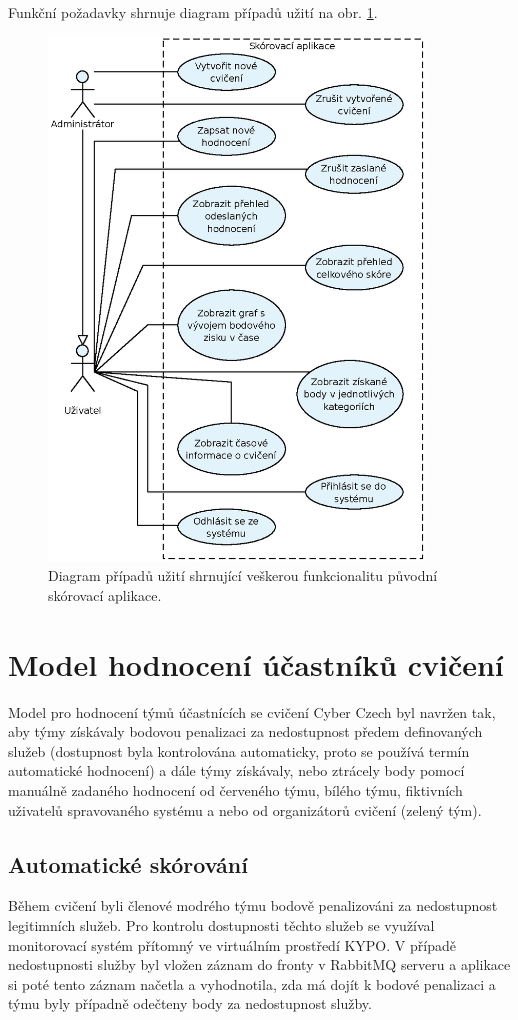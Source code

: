 \documentclass[
  digital, %
  twoside, %
  table,   %
  nolof,     %
  nolot,     %
]{fithesis3}
\begin{document}
Funkční požadavky shrnuje diagram případů užití na obr. \ref{fig:useCase1}.

\begin{figure}[h!]
    \centering
    \includegraphics[width=10cm]{images/Use-case-1.eps}
    \caption{Diagram případů užití shrnující veškerou funkcionalitu původní skórovací aplikace.}
    \label{fig:useCase1}
\end{figure}

\section{Model hodnocení účastníků cvičení}
Model pro hodnocení týmů účastnících se cvičení Cyber Czech byl navržen tak, aby týmy získávaly bodovou penalizaci za nedostupnost předem definovaných služeb (dostupnost byla kontrolována automaticky, proto se používá termín automatické hodnocení) a dále týmy získávaly, nebo ztrácely body pomocí manuálně zadaného hodnocení od červeného týmu, bílého týmu, fiktivních uživatelů spravovaného systému a nebo od organizátorů cvičení (zelený tým).

\subsection{Automatické skórování}
Během cvičení byli členové modrého týmu bodově penalizováni za nedostupnost legitimních služeb. Pro kontrolu dostupnosti těchto služeb se využíval monitorovací systém přítomný ve virtuálním prostředí KYPO. V případě nedostupnosti služby byl vložen záznam do fronty v RabbitMQ serveru a aplikace si poté tento záznam načetla a vyhodnotila, zda má dojít k bodové penalizaci a týmu byly případně odečteny body za nedostupnost služby.
\end{document}
